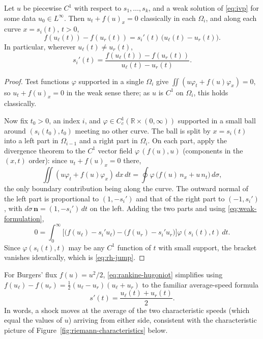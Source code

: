 \begin{theorem}
\label{thm:rankine-hugoniot}
Let $u$ be piecewise $C^1$ with respect to $s_1,\dots,s_k$, and a weak
solution of \eqref{eq:ivp} for some data $u_0\in L^\infty$. Then $u_t+f(u)_x=0$ classically in each
$\Omega_i$, and along each curve $x=s_i(t)$, $t>0$,
\begin{equation}
  \label{eq:rh-jump}
  f(u_\ell(t)) - f(u_r(t)) = s_i'(t)\,\big(u_\ell(t)-u_r(t)\big).
\end{equation}
In particular, wherever $u_\ell(t)\neq u_r(t)$,
\begin{equation}
  \label{eq:rankine-hugoniot}
  s_i'(t) = \frac{f(u_\ell(t)) - f(u_r(t))}{u_\ell(t) - u_r(t)}.
\end{equation}
\end{theorem}

\begin{proof}
Test functions $\varphi$ supported in a single $\Omega_i$ give
$\iint (u\varphi_t+f(u)\varphi_x)=0$, so $u_t+f(u)_x=0$ in the weak sense
there; as $u$ is $C^1$ on $\Omega_i$, this holds classically.

Now fix $t_0>0$, an index $i$, and $\varphi\in C_c^1(\mathbb{R}\times
(0,\infty))$ supported in a small ball around $(s_i(t_0),t_0)$ meeting no
other curve. The ball is split by $x=s_i(t)$ into a left part in
$\Omega_{i-1}$ and a right part in $\Omega_i$. On each part, apply the
divergence theorem to the $C^1$ vector field $\varphi\,(f(u),u)$ (components
in the $(x,t)$ order): since $u_t+f(u)_x=0$ there,
\begin{equation*}
  \iint (u\varphi_t+f(u)\varphi_x)\,dx\,dt
  = \oint \varphi\,\big(f(u)\,n_x+u\,n_t\big)\,d\sigma ,
\end{equation*}
the only boundary contribution being along the curve. The outward normal
of the left part is proportional to $(1,-s_i')$ and that of the right part
to $(-1,s_i')$, with $d\sigma\,\mathbf n=(1,-s_i')\,dt$ on the left. Adding
the two parts and using \eqref{eq:weak-formulation},
\begin{equation}
  \label{eq:rh-boundary}
  0=\int_0^\infty\Big[\big(f(u_\ell)-s_i'u_\ell\big)
    -\big(f(u_r)-s_i'u_r\big)\Big]\varphi(s_i(t),t)\,dt .
\end{equation}
Since $\varphi(s_i(t),t)$ may be any $C^1$ function of $t$ with small
support, the bracket vanishes identically, which is
\eqref{eq:rh-jump}.
\end{proof}

For Burgers' flux $f(u)=u^2/2$, \eqref{eq:rankine-hugoniot} simplifies
using $f(u_\ell)-f(u_r) = \tfrac12(u_\ell-u_r)(u_\ell+u_r)$ to the
familiar average-speed formula
\begin{equation}
  \label{eq:rankine-hugoniot-burgers}
  s'(t) = \frac{u_\ell(t) + u_r(t)}{2}.
\end{equation}
In words, a shock moves at the average of the two characteristic speeds
(which equal the values of $u$) arriving from either side, consistent
with the characteristic picture of
Figure~\ref{fig:riemann-characteristics} below.

